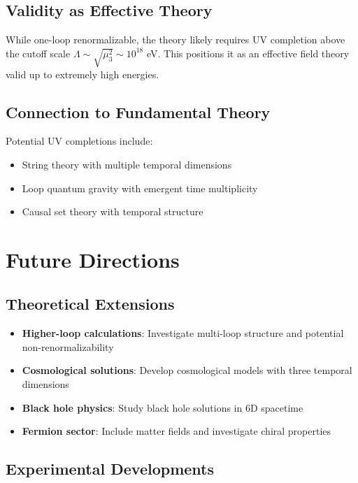 \documentclass[12pt,a4paper]{article}
\begin{document}
\subsection{Validity as Effective Theory}

While one-loop renormalizable, the theory likely requires UV completion above the cutoff scale $\Lambda \sim \sqrt{\mu_3^2} \sim 10^{18}$ eV. This positions it as an effective field theory valid up to extremely high energies.

\subsection{Connection to Fundamental Theory}

Potential UV completions include:
\begin{itemize}
\item String theory with multiple temporal dimensions
\item Loop quantum gravity with emergent time multiplicity  
\item Causal set theory with temporal structure
\end{itemize}

\section{Future Directions}
\label{sec:future_work}

\subsection{Theoretical Extensions}

\begin{itemize}
\item \textbf{Higher-loop calculations}: Investigate multi-loop structure and potential non-renormalizability
\item \textbf{Cosmological solutions}: Develop cosmological models with three temporal dimensions
\item \textbf{Black hole physics}: Study black hole solutions in 6D spacetime
\item \textbf{Fermion sector}: Include matter fields and investigate chiral properties
\end{itemize}

\subsection{Experimental Developments}
\end{document}
